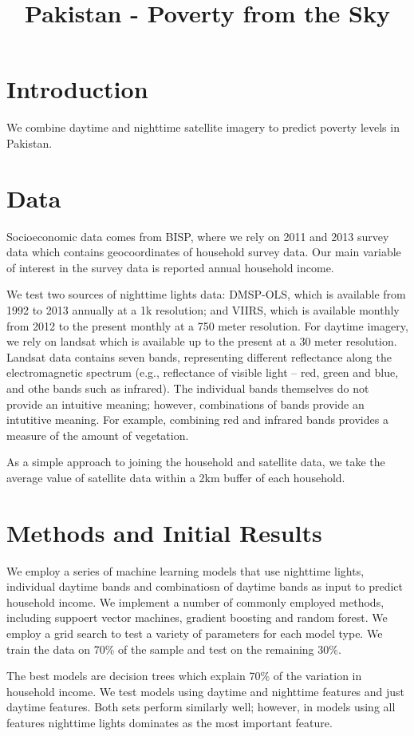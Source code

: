 \documentclass[8pt, oneside]{article}
\title{Pakistan - Poverty from the Sky}
\begin{document}
\maketitle

\section{Introduction}

We combine daytime and nighttime satellite imagery to predict poverty levels in Pakistan.

\section{Data}

Socioeconomic data comes from BISP, where we rely on 2011 and 2013  survey data which contains geocoordinates of household survey data. Our main variable of interest in the survey data is reported annual household income.
\par
We test two sources of nighttime lights data: DMSP-OLS, which is available from 1992 to 2013 annually at a 1k resolution; and VIIRS, which is available monthly from 2012 to the present monthly at a 750 meter resolution. For daytime imagery, we rely on landsat which is available up to the present at a 30 meter resolution. Landsat data contains seven bands, representing different reflectance along the electromagnetic spectrum (e.g., reflectance of visible light -- red, green and blue, and othe bands such as infrared). The individual bands themselves do not provide an intuitive meaning; however, combinations of bands provide an intutitive meaning. For example, combining red and infrared bands provides a measure of the amount of vegetation.
\par
As a simple approach to joining the household and satellite data, we take the average value of satellite data within a 2km buffer of each household.

\section{Methods and Initial Results}
We employ a series of machine learning models that use nighttime lights, individual daytime bands and combinatiosn of daytime bands as input to predict household income. We implement a number of commonly employed methods, including suppoert vector machines, gradient boosting and random forest. We employ a grid search to test a variety of parameters for each model type. We train the data on 70\% of the sample and test on the remaining 30\%. 
\par
The best models are decision trees which explain 70\% of the variation in household income. We test models using daytime and nighttime features and just daytime features. Both sets perform similarly well; however, in models using all features nighttime lights dominates as the most important feature.
\end{document}
